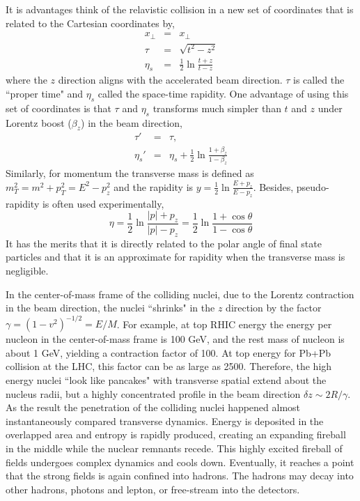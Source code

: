 It is advantages think of the relavistic collision in a new set of coordinates that is related to the Cartesian coordinates by,
\begin{eqnarray}
x_\perp &=& x_\perp\\
\tau &=& \sqrt{t^2 - z^2}\\
\eta_s &=& \frac{1}{2}\ln\frac{t+z}{t-z}
\end{eqnarray}
where the $z$ direction aligns with the accelerated beam direction.
$\tau$ is called the ``proper time" and $\eta_s$ called the space-time rapidity.
One advantage of using this set of coordinates is that $\tau$ and $\eta_s$ transforms much simpler than $t$ and $z$ under Lorentz boost ($\beta_z$) in the beam direction,
\begin{eqnarray}
\tau' &=& \tau,\\
\eta_s' &=& \eta_s + \frac{1}{2}\ln\frac{1+\beta_z}{1-\beta_z}
\end{eqnarray}
Similarly, for momentum the transverse mass is defined as $m_T^2 = m^2 + p_T^2 = E^2 - p_z^2$ and the rapidity is $y = \frac{1}{2}\ln\frac{E+p_z}{E-p_z}$.
Besides, pseudo-rapidity is often used experimentally,
\begin{equation}
    \eta = \frac{1}{2}\ln\frac{|p|+p_z}{|p|-p_z} = \frac{1}{2}\ln\frac{1+\cos\theta}{1-\cos\theta}
\end{equation}
It has the merits that it is directly related to the polar angle of final state particles and that it is an approximate for rapidity when the transverse mass is negligible.

In the center-of-mass frame of the colliding nuclei, due to the Lorentz contraction in the beam direction, the nuclei ``shrinks" in the $z$ direction by the factor $\gamma = (1-v^2)^{-1/2} = E/M$. 
For example, at top RHIC energy the energy per nucleon in the center-of-mass frame is 100 GeV, and the rest mass of nucleon is about 1 GeV, yielding a contraction factor of 100. 
At top energy for Pb+Pb collision at the LHC, this factor can be as large as 2500.
Therefore, the high energy nuclei ``look like pancakes" with transverse spatial extend about the nucleus radii, but a highly concentrated profile in the beam direction $\delta z \sim 2R/\gamma$.
As the result the penetration of the colliding nuclei happened almost instantaneously compared transverse dynamics.
Energy is deposited in the overlapped area and entropy is rapidly produced, creating an expanding fireball in the middle while the nuclear remnants recede.
This highly excited fireball of fields undergoes complex dynamics and cools down.
Eventually, it reaches a point that the strong fields is again confined into hadrons. The hadrons may decay into other hadrons, photons and lepton, or free-stream into the detectors.

